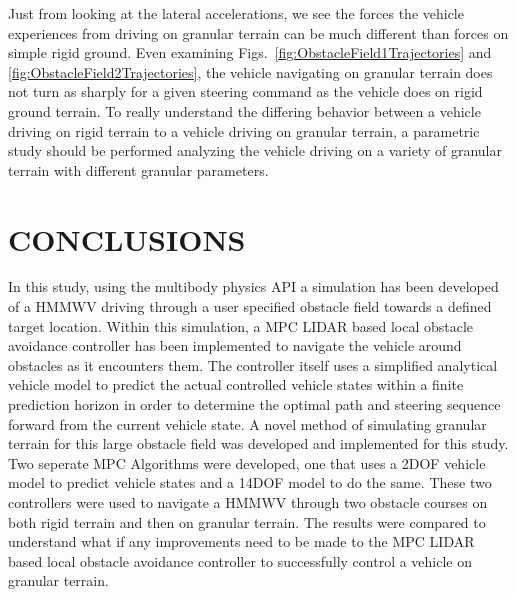 \documentclass[12pt,twocolumn]{article}
\newcommand{\CHRONO}{{\sffamily{{Chrono}}}}
\begin{document}
Just from looking at the lateral accelerations, we see the forces the vehicle experiences from driving on granular terrain can be much different than forces on simple rigid ground. Even examining Figs.~\ref{fig:ObstacleField1Trajectories} and \ref{fig:ObstacleField2Trajectories}, the vehicle navigating on granular terrain does not turn as sharply for a given steering command as the vehicle does on rigid ground terrain. To really understand the differing behavior between a vehicle driving on rigid terrain to a vehicle driving on granular terrain, a parametric study should be performed analyzing the vehicle driving on a variety of granular terrain with different granular parameters. 


\section{CONCLUSIONS}\label{s:conclusion}

In this study, using the multibody physics API {\CHRONO} a simulation has been developed of a HMMWV driving through a user specified obstacle field towards a defined target location. Within this simulation, a MPC LIDAR based local obstacle avoidance controller has been implemented to navigate the vehicle around obstacles as it encounters them. The controller itself uses a simplified analytical vehicle model to predict the actual controlled {\CHRONO} vehicle states within a finite prediction horizon in order to determine the optimal path and steering sequence forward from the current vehicle state. A novel method of simulating granular terrain for this large obstacle field was developed and implemented for this study. Two seperate MPC Algorithms were developed, one that uses a 2DOF vehicle model to predict {\CHRONO} vehicle states and a 14DOF model to do the same. These two controllers were used to navigate a {\CHRONO} HMMWV through two obstacle courses on both rigid terrain and then on granular terrain. The results were compared to understand what if any improvements need to be made to the MPC LIDAR based local obstacle avoidance controller to successfully control a vehicle on granular terrain. 
\end{document}
